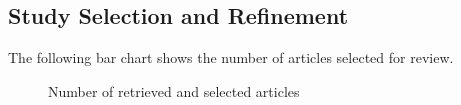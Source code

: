 \subsection{Study Selection and Refinement}

The following bar chart shows the number of articles selected for review. 

\begin{figure}[H]
    
    \caption{Number of retrieved and selected articles}
    \label{fig:bar-chart-yaer}
\end{figure}
